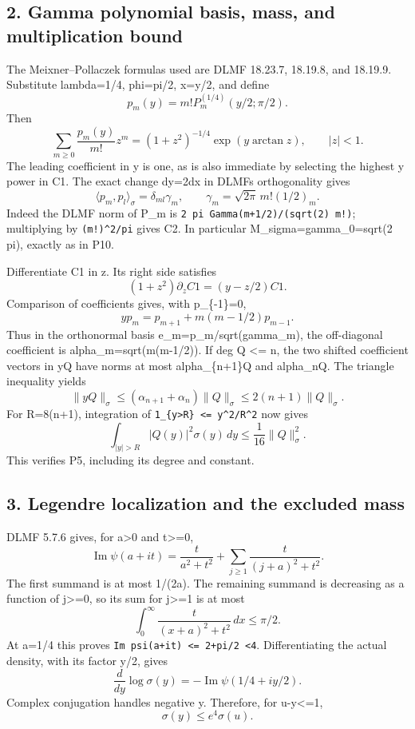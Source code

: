 \documentclass[11pt]{article}
\begin{document}
\subsection{2. Gamma polynomial basis, mass, and multiplication bound}\label{mrcoerc:gamma-polynomial-basis-mass-and-multiplication-bound}

The Meixner--Pollaczek formulas used are DLMF 18.23.7, 18.19.8, and 18.19.9. Substitute lambda=1/4, phi=pi/2, x=y/2, and define \[
p_m(y)=m!P_m^{(1/4)}(y/2;\pi/2).
\] Then \[
\sum_{m\ge0}\frac{p_m(y)}{m!}z^m
 =(1+z^2)^{-1/4}\exp(y\arctan z),\qquad |z|<1.
\tag{C1}
\] The leading coefficient in y is one, as is also immediate by selecting the highest y power in C1. The exact change dy=2dx in DLMF\textquotesingle s orthogonality gives \[
\langle p_m,p_l\rangle_\sigma=\delta_{ml}\gamma_m,
\qquad
\gamma_m=\sqrt{2\pi}\,m!(1/2)_m.
\tag{C2}
\] Indeed the DLMF norm of P\_m is \texttt{2\ pi\ Gamma(m+1/2)/(sqrt(2)\ m!)}; multiplying by \texttt{(m!)\^{}2/pi} gives C2. In particular M\_sigma=gamma\_0=sqrt(2 pi), exactly as in P10.

Differentiate C1 in z. Its right side satisfies \[
(1+z^2)\partial_z C1=(y-z/2)C1.
\] Comparison of coefficients gives, with p\_\{-1\}=0, \[
yp_m=p_{m+1}+m(m-1/2)p_{m-1}.
\tag{C3}
\] Thus in the orthonormal basis e\_m=p\_m/sqrt(gamma\_m), the off-diagonal coefficient is alpha\_m=sqrt(m(m-1/2)). If deg Q \textless= n, the two shifted coefficient vectors in yQ have norms at most alpha\_\{n+1\}\textbar\textbar Q\textbar\textbar{} and alpha\_n\textbar\textbar Q\textbar\textbar. The triangle inequality yields \[
\|yQ\|_\sigma\le(\alpha_{n+1}+\alpha_n)\|Q\|_\sigma
 \le2(n+1)\|Q\|_\sigma.
\tag{C4}
\] For R=8(n+1), integration of \texttt{1\_\{\textbar{}y\textbar{}\textgreater{}R\}\ \textless{}=\ y\^{}2/R\^{}2} now gives \[
\int_{|y|>R}|Q(y)|^2\sigma(y)\,dy\le\frac1{16}\|Q\|_\sigma^2.
\tag{C5}
\] This verifies P5, including its degree and constant.

\subsection{3. Legendre localization and the excluded mass}\label{mrcoerc:legendre-localization-and-the-excluded-mass}

DLMF 5.7.6 gives, for a\textgreater0 and t\textgreater=0, \[
\operatorname{Im}\psi(a+it)=\frac{t}{a^2+t^2}
 +\sum_{j\ge1}\frac{t}{(j+a)^2+t^2}.
\] The first summand is at most 1/(2a). The remaining summand is decreasing as a function of j\textgreater=0, so its sum for j\textgreater=1 is at most \[
\int_0^\infty\frac{t}{(x+a)^2+t^2}\,dx\le\pi/2.
\] At a=1/4 this proves \texttt{\textbar{}Im\ psi(a+it)\textbar{}\ \textless{}=\ 2+pi/2\ \textless{}4}. Differentiating the actual density, with its factor y/2, gives \[
\frac d{dy}\log\sigma(y)=-\operatorname{Im}\psi(1/4+iy/2).
\] Complex conjugation handles negative y. Therefore, for \textbar u-y\textbar\textless=1, \[
\sigma(y)\le e^4\sigma(u).
\tag{C6}
\]
\end{document}
